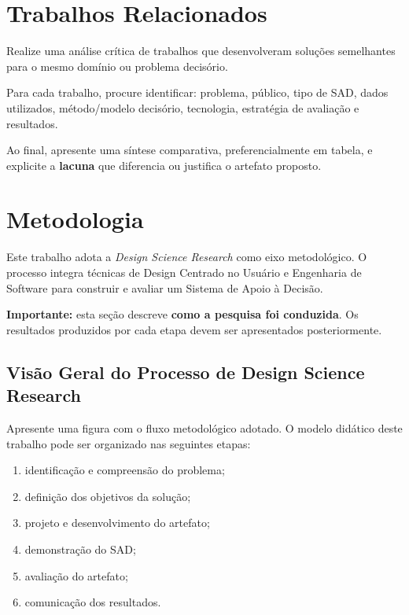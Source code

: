 \documentclass[12pt]{article}
\begin{document}
\section{Trabalhos Relacionados}
\label{sec:relacionados}

Realize uma análise crítica de trabalhos que desenvolveram soluções semelhantes para o mesmo domínio ou problema decisório.

Para cada trabalho, procure identificar: problema, público, tipo de SAD, dados utilizados, método/modelo decisório, tecnologia, estratégia de avaliação e resultados.

Ao final, apresente uma síntese comparativa, preferencialmente em tabela, e explicite a \textbf{lacuna} que diferencia ou justifica o artefato proposto.

\section{Metodologia}
\label{sec:metodologia}

Este trabalho adota a \textit{Design Science Research} como eixo metodológico. O processo integra técnicas de Design Centrado no Usuário e Engenharia de Software para construir e avaliar um Sistema de Apoio à Decisão.

\textbf{Importante:} esta seção descreve \textbf{como a pesquisa foi conduzida}. Os resultados produzidos por cada etapa devem ser apresentados posteriormente.

\subsection{Visão Geral do Processo de Design Science Research}

Apresente uma figura com o fluxo metodológico adotado. O modelo didático deste trabalho pode ser organizado nas seguintes etapas:

\begin{enumerate}
    \item identificação e compreensão do problema;
    \item definição dos objetivos da solução;
    \item projeto e desenvolvimento do artefato;
    \item demonstração do SAD;
    \item avaliação do artefato;
    \item comunicação dos resultados.
\end{enumerate}
\end{document}
